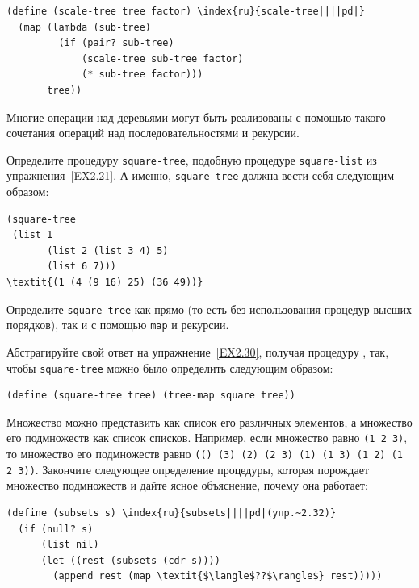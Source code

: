 \begin{Verbatim}[fontsize=\small]
(define (scale-tree tree factor) \index{ru}{scale-tree||||pd|}
  (map (lambda (sub-tree)
         (if (pair? sub-tree)
             (scale-tree sub-tree factor)
             (* sub-tree factor)))
       tree))
\end{Verbatim}
Многие операции над деревьями могут быть реализованы с помощью
такого сочетания операций над последовательностями и рекурсии.
\begin{exercise}{2.30}\label{EX2.30}%
Определите процедуру {\tt square-tree}, подобную 
процедуре {\tt square-list} из упражнения~\ref{EX2.21}.  А именно, {\tt square-tree}
должна вести себя следующим образом:

\begin{Verbatim}[fontsize=\small]
(square-tree
 (list 1
       (list 2 (list 3 4) 5)
       (list 6 7)))
\textit{(1 (4 (9 16) 25) (36 49))}
\end{Verbatim}
Определите {\tt square-tree} как прямо (то есть без
использования процедур высших порядков), так и с помощью
{\tt map} и рекурсии.
\end{exercise}
\begin{exercise}{2.31}\label{EX2.31}%
Абстрагируйте свой ответ на упражнение~\ref{EX2.30}, получая процедуру
, так, чтобы {\tt square-tree} можно было
определить следующим образом:
\begin{Verbatim}[fontsize=\small]
(define (square-tree tree) (tree-map square tree))
\end{Verbatim}
\end{exercise}
\begin{exercise}{2.32}\label{EX2.32}%
Множество можно представить как список его различных 
элементов, а множество его подмножеств как список списков.  Например,
если множество равно {\tt (1 2 3)}, то множество его
подмножеств равно {\tt (() (3) (2) (2 3) (1) (1 3) (1 2) (1 2
3))}.  Закончите следующее определение процедуры, которая
порождает множество подмножеств и дайте ясное объяснение, почему она
работает:

\begin{Verbatim}[fontsize=\small]
(define (subsets s) \index{ru}{subsets||||pd|(упр.~2.32)}
  (if (null? s)
      (list nil)
      (let ((rest (subsets (cdr s))))
        (append rest (map \textit{$\langle$??$\rangle$} rest)))))
\end{Verbatim}
\end{exercise}

